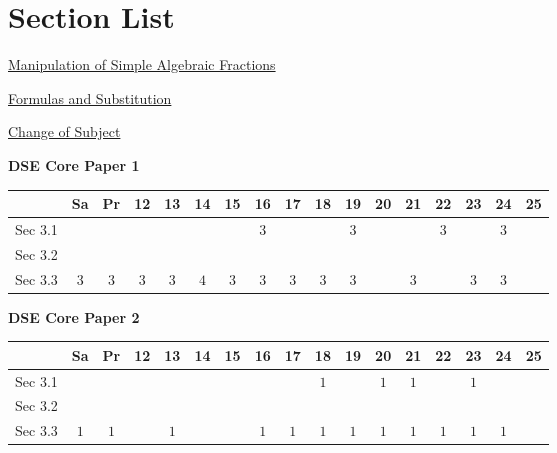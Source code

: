 \documentclass[12pt, a4paper]{article}
\begin{document}
\section*{Section List}
\begin{enumx}[label=Sec 3.\arabic*\ ]
\item \hyperref[section:2-3-1]{Manipulation of Simple Algebraic Fractions}
\item \hyperref[section:2-3-2]{Formulas and Substitution}
\item \hyperref[section:2-3-3]{Change of Subject}
\end{enumx}
\begin{absolutelynopagebreak}
\begin{center}
\textbf{DSE Core Paper 1}
\end{center}
\begin{center}
\begin{tabular}{|l|c|c|c|c|c|c|c|c|c|c|c|c|c|c|c|c|}
\hline
        & Sa & Pr & 12 & 13 & 14 & 15 & 16 & 17 & 18 & 19 & 20 & 21 & 22 & 23 & 24 & 25 \\\hline\hline
Sec 3.1 &  &  &  &  &  &  &  $3$ &  &  &  $3$ &  &  &  $3$ &  &  $3$ &  \\\hline
Sec 3.2 &  &  &  &  &  &  &  &  &  &  &  &  &  &  &  &  \\\hline
Sec 3.3 &  $3$ &  $3$ &  $3$ &  $3$ &  $4$ &  $3$ &  $3$ &  $3$ &  $3$ &  $3$ &  &  $3$ &  &  $3$ &  $3$ &  \\\hline
\end{tabular}
\end{center}
\end{absolutelynopagebreak}
\begin{absolutelynopagebreak}
\begin{center}
\textbf{DSE Core Paper 2}
\end{center}
\begin{center}
\begin{tabular}{|l|c|c|c|c|c|c|c|c|c|c|c|c|c|c|c|c|}
\hline
        & Sa & Pr & 12 & 13 & 14 & 15 & 16 & 17 & 18 & 19 & 20 & 21 & 22 & 23 & 24 & 25 \\\hline\hline
Sec 3.1 &  &  &  &  &  &  &  &  &  $1$ &  &  $1$ &  $1$ &  &  $1$ &  &  \\\hline
Sec 3.2 &  &  &  &  &  &  &  &  &  &  &  &  &  &  &  &  \\\hline
Sec 3.3 &  $1$ &  $1$ &  &  $1$ &  &  &  $1$ &  $1$ &  $1$ &  $1$ &  $1$ &  $1$ &  $1$ &  $1$ &  $1$ &  \\\hline
\end{tabular}
\end{center}
\end{absolutelynopagebreak}
\end{document}
